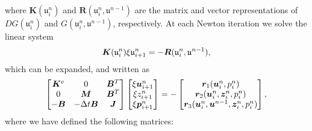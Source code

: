 where $\boldsymbol{K}(\mathfrak{u}_{i}^{n})$ and $\boldsymbol{R}(\mathfrak{u}_{i}^{n},\mathfrak{u}^{n-1})$ are the matrix and vector representations of $DG(\mathfrak{u}_{i}^{n})$ and $G(\mathfrak{u}_{i}^{n},\mathfrak{u}^{n-1})$, respectively.
At each Newton iteration we solve the linear system
\begin{equation}
\boldsymbol{K}(\mathfrak{u}_{i}^{n}) \xi \mathfrak{u}_{i+1}^{n} = - \boldsymbol{R}(\mathfrak{u}_{i}^{n},\mathfrak{u}^{n-1}),
\end{equation}
which can be expanded, and written as
 \begin{equation*}
 \begin{bmatrix}
  \boldsymbol{K}^{e} & 0 & \boldsymbol{B}^{T} \\
  0 & \boldsymbol{M} & \boldsymbol{B}^{T} \\
  -\boldsymbol{B} & -\Delta t \boldsymbol{B} &\boldsymbol{J}
 \end{bmatrix}
 \begin{bmatrix}
  \xi \boldsymbol{u}^{n}_{i+1} \\
  \xi{z}^{n}_{i+1} \\
 \xi \boldsymbol{p}^{n}_{i+1}
 \end{bmatrix}= -
 \begin{bmatrix}
  \boldsymbol{r}_{1}(\boldsymbol{u}^{n}_{i},{p}^{n}_{i}) \\
  \boldsymbol{r}_{2}(\boldsymbol{u}^{n}_{i},\boldsymbol{z}^{n}_{i},{p}^{n}_{i})  \\
  \boldsymbol{r}_{3}(\boldsymbol{u}^{n}_{i},\boldsymbol{u}^{n-1},\boldsymbol{z}^{n}_{i},{p}^{n}_{i})
 \end{bmatrix},
 \end{equation*}
 where we have defined the following matrices:
